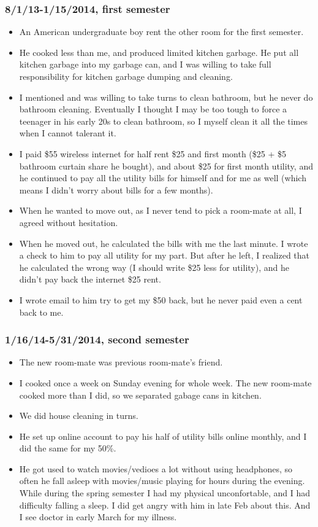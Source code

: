 \documentclass[9pt,b5paper]{article}
\begin{document}
\subsubsection{8/1/13-1/15/2014, first semester}
\label{sec-2-2-1}
\begin{itemize}
\item An American undergraduate boy rent the other room for the first semester.
\item He cooked less than me, and produced limited kitchen garbage. He put all kitchen garbage into my garbage can, and I was willing to take full responsibility for kitchen garbage dumping and cleaning.
\item I mentioned and was willing to take turns to clean bathroom, but he never do bathroom cleaning. Eventually I thought I may be too tough to force a teenager in his early 20s to clean bathroom, so I myself clean it all the times when I cannot talerant it.
\item I paid \$55 wireless internet for half rent \$25 and first month (\$25 + \$5 bathroom curtain share he bought), and about \$25 for first month utility, and he continued to pay all the utility bills for himself and for  me as well (which means I didn't worry about bills for a few months).
\item When he wanted to move out, as I never tend to pick a room-mate at all, I agreed without hesitation.
\item When he moved out, he calculated the bills with me the last minute. I wrote a check to him to pay all utility for my part. But after he left, I realized that he calculated the wrong way (I should write \$25 less for utility), and he didn't pay back the internet \$25 rent.
\item I wrote email to him try to get my \$50 back, but he never paid even a cent back to me.
\end{itemize}
\subsubsection{1/16/14-5/31/2014, second semester}
\label{sec-2-2-2}
\begin{itemize}
\item The new room-mate was previous room-mate's friend.
\item I cooked once a week on Sunday evening for whole week. The new room-mate cooked more than I did, so we separated gabage cans in kitchen.
\item We did house cleaning in turns.
\item He set up online account to pay his half of utility bills online monthly, and I did the same for my 50\%.
\item He got used to watch movies/vedioes a lot without using headphones, so often he fall asleep with movies/music playing for hours during the evening. While during the spring semester I had my physical unconfortable, and I had difficulty falling a sleep. I did get angry with him in late Feb about this. And I see doctor in early March for my illness.
\end{itemize}
\end{document}

